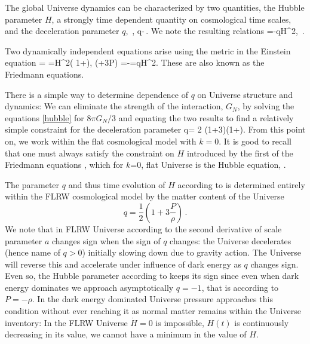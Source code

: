 The global Universe dynamics can be characterized by two quantities, the Hubble parameter $H$, a strongly time dependent quantity on cosmological time scales, and the deceleration parameter $q$,
\beqn\label{dynamic}
\,, 
\eeqn
\beqn\label{dynamic1}
q\equiv -\,.
\eeqn
We note the resulting relations
\beqn\label{eq:Hdot1}
 =-qH^2,
 \eeqn
\beqn\label{eq:Hdot}
 \,. 
\eeqn
{}

Two dynamically independent equations arise using the metric  in the Einstein equation 
\beqn\label{hubble}
 \rho = 
=H^2\left( 1+\right),
\qquad
{} (\rho+3P) =-=qH^2.
\eeqn
These are also known as the Friedmann equations. 

There is a simple way to determine dependence of $q$ on Universe structure and dynamics: We can eliminate the strength of the interaction, $G_N$, by solving the equations \eqref{hubble} for ${8\pi G_N}/{3}$ and equating the two results to find a relatively simple constraint for the deceleration parameter
\beqn\label{qparam0}
q= 2 \left(1+3\right)\left(1+\right).
\eeqn
From this point on, we work within the flat cosmological model with $k=0$. It is good to recall that one must always satisfy the constraint on $H$ introduced by the first of the Friedmann equations , which for $k$=0, flat Universe is the Hubble equation, .

The parameter $q$ and thus time evolution of $H$ according to  is determined entirely within the FLRW cosmological model by the matter content of the Universe
\begin{equation}\label{qparam}
\boxed{q=\frac 1 2 \left(1+3\frac{P}{\rho}\right)}\,.
\end{equation}
We note that in FLRW Universe according to  the second derivative of scale parameter $a$ changes sign when the sign of $q$ changes: the Universe decelerates (hence name of $q>0$) initially slowing down due to gravity action. The Universe will reverse this and accelerate under influence of dark energy as $q$ changes sign. Even so, the Hubble parameter according to  keeps its sign since even when dark energy dominates we approach asymptotically $q=-1$, that is according to  $P=-\rho$. In the dark energy dominated Universe pressure approaches this condition without ever reaching it as normal matter remains within the Universe inventory: In the FLRW Universe $\dot H=0$ is impossible, $H(t)$ is continuously decreasing in its value,  we cannot have a minimum in the value of $H$. 

